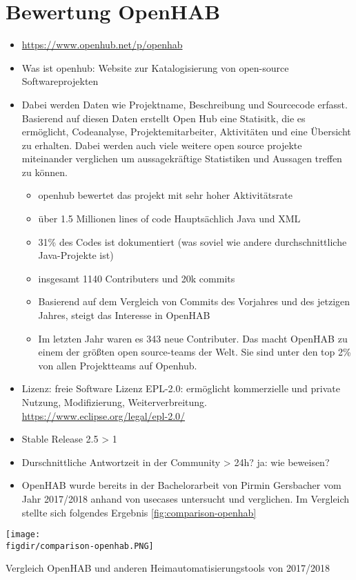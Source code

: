 \section{Bewertung OpenHAB}
\begin{itemize}
	\item \url{https://www.openhub.net/p/openhab}
	\item Was ist openhub: Website zur Katalogisierung von open-source Softwareprojekten
	\item Dabei werden Daten wie Projektname, Beschreibung und Sourcecode erfasst. Basierend auf diesen Daten erstellt Open Hub eine Statisitk, die es ermöglicht, Codeanalyse, Projektemitarbeiter, Aktivitäten und eine Übersicht zu erhalten. Dabei werden auch viele weitere open source projekte miteinander verglichen um aussagekräftige Statistiken und Aussagen treffen zu können.
	\begin{itemize}
		\item openhub bewertet das projekt mit sehr hoher Aktivitätsrate
		\item über 1.5 Millionen lines of code Hauptsächlich Java und XML
		\item 31\% des Codes ist dokumentiert (was soviel wie andere durchschnittliche Java-Projekte ist)
		\item insgesamt 1140 Contributers und 20k commits
		\item Basierend auf dem Vergleich von Commits des Vorjahres und des jetzigen Jahres, steigt das Interesse in OpenHAB
		\item Im letzten Jahr waren es 343 neue Contributer. Das macht OpenHAB zu einem der größten open source-teams der Welt. Sie sind unter den top 2\% von allen Projektteams auf Openhub.
	\end{itemize}
	\item Lizenz: freie Software Lizenz EPL-2.0: ermöglicht kommerzielle und private Nutzung, Modifizierung, Weiterverbreitung. \url{https://www.eclipse.org/legal/epl-2.0/}
	\item Stable Release 2.5 > 1
	\item Durschnittliche Antwortzeit in der Community > 24h? ja: wie beweisen?
	\item OpenHAB wurde bereits in der Bachelorarbeit von Pirmin Gersbacher vom Jahr 2017/2018 anhand von usecases untersucht und verglichen. Im Vergleich stellte sich folgendes Ergebnis \ref{fig:comparison-openhab}\cite{BA01:OPH}
\end{itemize}

\begin{minipage}{\textwidth}
	\centering
	\captionsetup{type=figure}
	\texttt{[image: \\figdir/comparison-openhab.PNG]}
	\caption{Vergleich OpenHAB und anderen Heimautomatisierungstools von 2017/2018 \label{fig:comparison-openhab}}
\end{minipage}


